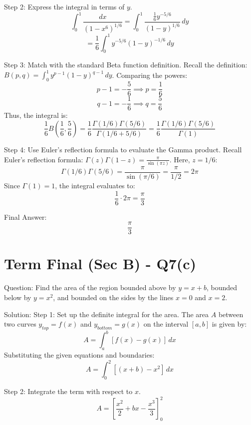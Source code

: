 \documentclass{article}
\begin{document}
Step 2: Express the integral in terms of \(y\).
\[
\int_0^1 \frac{dx}{(1-x^6)^{1/6}} = \int_0^1 \frac{\frac{1}{6} y^{-5/6}}{(1-y)^{1/6}} \, dy
\]
\[
= \frac{1}{6} \int_0^1 y^{-5/6} (1-y)^{-1/6} \, dy
\]

Step 3: Match with the standard Beta function definition.
Recall the definition: \(B(p, q) = \int_0^1 y^{p-1} (1-y)^{q-1} \, dy\).
Comparing the powers:
\[
p - 1 = -\frac{5}{6} \implies p = \frac{1}{6}
\]
\[
q - 1 = -\frac{1}{6} \implies q = \frac{5}{6}
\]
Thus, the integral is:
\[
\frac{1}{6} B\left(\frac{1}{6}, \frac{5}{6}\right) = \frac{1}{6} \frac{\Gamma(1/6)\Gamma(5/6)}{\Gamma(1/6+5/6)} = \frac{1}{6} \frac{\Gamma(1/6)\Gamma(5/6)}{\Gamma(1)}
\]

Step 4: Use Euler's reflection formula to evaluate the Gamma product.
Recall Euler's reflection formula: \(\Gamma(z)\Gamma(1-z) = \frac{\pi}{\sin(\pi z)}\).
Here, \(z = 1/6\):
\[
\Gamma(1/6)\Gamma(5/6) = \frac{\pi}{\sin(\pi/6)} = \frac{\pi}{1/2} = 2\pi
\]
Since \(\Gamma(1) = 1\), the integral evaluates to:
\[
\frac{1}{6} \cdot 2\pi = \frac{\pi}{3}
\]

Final Answer:
\[
\boxed{\frac{\pi}{3}}
\]

\section*{Term Final (Sec B) - Q7(c)}
Question:
Find the area of the region bounded above by \(y = x + b\), bounded below by \(y = x^2\), and bounded on the sides by the lines \(x = 0\) and \(x = 2\).

Solution:
Step 1: Set up the definite integral for the area.
The area \(A\) between two curves \(y_{top} = f(x)\) and \(y_{bottom} = g(x)\) on the interval \([a, b]\) is given by:
\[
A = \int_a^b [f(x) - g(x)] \, dx
\]
Substituting the given equations and boundaries:
\[
A = \int_0^2 [(x + b) - x^2] \, dx
\]

Step 2: Integrate the term with respect to \(x\).
\[
A = \left[ \frac{x^2}{2} + bx - \frac{x^3}{3} \right]_0^2
\]
\end{document}
